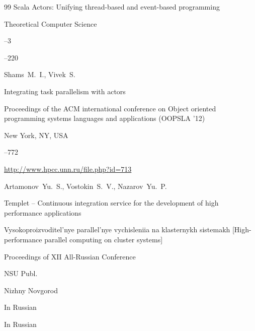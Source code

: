 \begin{thebibliography}{99}
\paper Scala Actors: Unifying thread-based and   event-based programming


\jour Theoretical   Computer Science



--3 

--220 








\by Shams~M.~I., Vivek~S.


\paper Integrating task parallelism  with actors

\inbook  Proceedings of the ACM international conference on Object oriented programming systems languages and applications (OOPSLA '12)

\publaddr New York, NY, USA


--772








\elink \url{http://www.hpcc.unn.ru/file.php?id=713}

\by Artamonov~Yu.~S., Vostokin~S.~V., Nazarov~Yu.~P.

\paper Templet – Continuous integration service for the development of high performance applications

\inbook Vysokoproizvoditel'nye parallel'nye vychisleniia na klasternykh sistemakh \rm [High-performance parallel computing on cluster systems]

\bookinfo Proceedings of XII All-Russian Conference



\publ NSU Publ.

\publaddr Nizhny Novgorod

\lang In Russian






\lang In Russian



\end{thebibliography}
